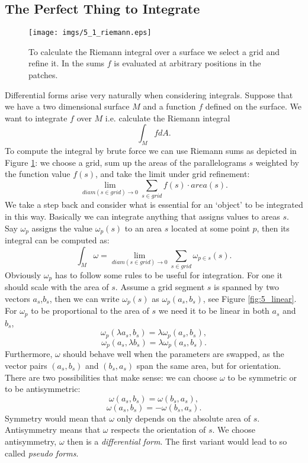 \subsection{The Perfect Thing to Integrate}
\label{sec:dfmotivation}
\begin{figure}
	\begin{center}
	\texttt{[image: imgs/5\_1\_riemann.eps]}
	\end{center}
	\vspace{-1cm}
	\caption{To calculate the Riemann integral over a surface we select a grid and refine it. In the sums $f$ is evaluated at arbitrary positions in the patches.}
	\label{fig:5_1_riemsum}
\end{figure}

Differential forms arise very naturally when considering integrals. Suppose that we have a two dimensional surface $M$ and a function $f$ defined on the surface. We want to integrate $f$ over $M$ i.e. calculate the Riemann integral
\[\int_{M} f dA.\]
To compute the integral by brute force we can use Riemann sums as depicted in Figure \ref{fig:5_1_riemsum}: we choose a grid, sum up the areas of the parallelograms $s$ weighted by the  function value $f(s)$, and take the limit under grid refinement:
\[\lim_{diam(s\in grid)\rightarrow 0} \sum_{s \in grid} f(s)\cdot area(s) .\]
We take a step back and consider what is essential for an `object' to be integrated in this way.
Basically we can integrate anything that assigns values to areas $s$. Say $\omega_p$ assigns the value $\omega_p(s)$ to an area $s$ located at some point $p$, then its integral can be computed as:
\[\int_M \omega = \lim_{diam(s\in grid)\rightarrow 0} \sum_{s \in grid} \omega_{p\in s}(s).\]
Obviously $\omega_p$ has to follow some rules to be useful for integration. For one it should scale with the area of $s$. Assume a grid segment $s$ is spanned by two vectors $a_s$,$b_s$, then we can write $\omega_p(s)$ as $\omega_p(a_s,b_s)$, see Figure \ref{fig:5_linear}. For $\omega_p$ to be proportional to the area of $s$ we need it to be linear in both $a_s$ and $b_s$,
\[\omega_p(\lambda a_s, b_s) =\lambda \omega_p(a_s,b_s),\]
\[\omega_p(a_s , \lambda b_s) =\lambda \omega_p(a_s,b_s).\]
Furthermore, $\omega$ should behave well when the parameters are swapped, as the vector pairs $(a_s,b_s)$ and $(b_s,a_s)$ span the same area, but for orientation. There are two possibilities that make sense: we can choose $\omega$ to be symmetric or to be antisymmetric:
\[\omega(a_s,b_s) = \omega(b_s,a_s),\]
\[\omega(a_s,b_s) = - \omega(b_s,a_s).\]
Symmetry would mean that $\omega$ only depends on the absolute area of $s$. Antisymmetry means that $\omega$ respects the orientation of $s$. We choose antisymmetry, $\omega$ then is a \emph{differential form}. The first variant would lead to so called \emph{pseudo forms}. 

